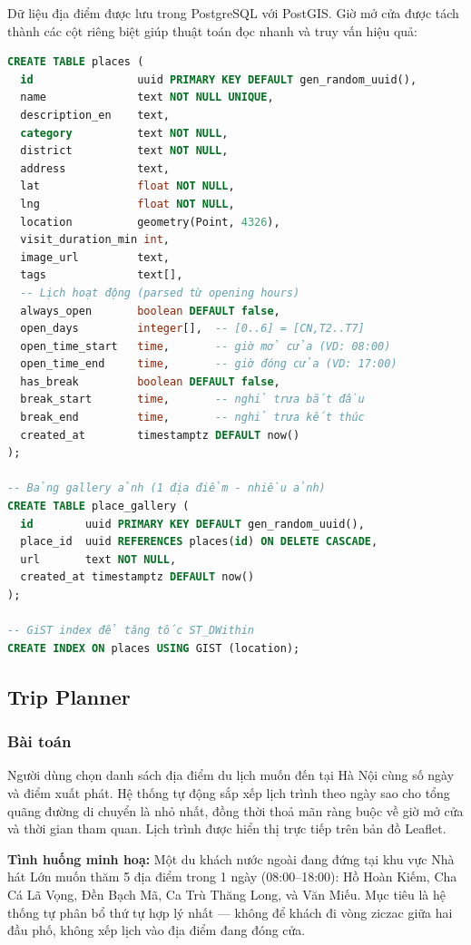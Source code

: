 \documentclass[12pt,a4paper]{article}
\begin{document}
Dữ liệu địa điểm được lưu trong PostgreSQL với PostGIS. Giờ mở cửa được
tách thành các cột riêng biệt giúp thuật toán đọc nhanh và truy vấn hiệu
quả:

\begin{lstlisting}[language=SQL]
CREATE TABLE places (
  id                uuid PRIMARY KEY DEFAULT gen_random_uuid(),
  name              text NOT NULL UNIQUE,
  description_en    text,
  category          text NOT NULL,
  district          text NOT NULL,
  address           text,
  lat               float NOT NULL,
  lng               float NOT NULL,
  location          geometry(Point, 4326),
  visit_duration_min int,
  image_url         text,
  tags              text[],
  -- Lịch hoạt động (parsed từ opening hours)
  always_open       boolean DEFAULT false,
  open_days         integer[],  -- [0..6] = [CN,T2..T7]
  open_time_start   time,       -- giờ mở cửa (VD: 08:00)
  open_time_end     time,       -- giờ đóng cửa (VD: 17:00)
  has_break         boolean DEFAULT false,
  break_start       time,       -- nghỉ trưa bắt đầu
  break_end         time,       -- nghỉ trưa kết thúc
  created_at        timestamptz DEFAULT now()
);

-- Bảng gallery ảnh (1 địa điểm - nhiều ảnh)
CREATE TABLE place_gallery (
  id        uuid PRIMARY KEY DEFAULT gen_random_uuid(),
  place_id  uuid REFERENCES places(id) ON DELETE CASCADE,
  url       text NOT NULL,
  created_at timestamptz DEFAULT now()
);

-- GiST index để tăng tốc ST_DWithin
CREATE INDEX ON places USING GIST (location);
\end{lstlisting}

\subsection{Trip Planner}

\subsubsection{Bài toán}

Người dùng chọn danh sách địa điểm du lịch muốn đến tại Hà Nội cùng số ngày
và điểm xuất phát. Hệ thống tự động sắp xếp lịch trình theo ngày sao cho tổng
quãng đường di chuyển là nhỏ nhất, đồng thời thoả mãn ràng buộc về giờ mở cửa
và thời gian tham quan. Lịch trình được hiển thị trực tiếp trên bản đồ Leaflet.

\medskip
\textbf{Tình huống minh hoạ:} Một du khách nước ngoài đang đứng tại khu vực
Nhà hát Lớn muốn thăm 5 địa điểm trong 1 ngày (08:00--18:00): Hồ Hoàn Kiếm,
Cha Cá Lã Vọng, Đền Bạch Mã, Ca Trù Thăng Long, và Văn Miếu. Mục tiêu là hệ
thống tự phân bổ thứ tự hợp lý nhất --- không để khách đi vòng ziczac giữa hai
đầu phố, không xếp lịch vào địa điểm đang đóng cửa.
\end{document}
